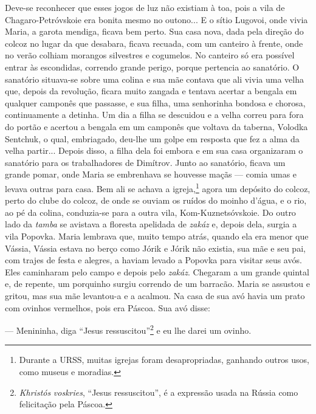 Deve-se reconhecer que esses jogos de luz não existiam à toa, pois a
vila de Chagaro-Petróvskoie era bonita mesmo no outono... E o sítio
Lugovoi, onde vivia Maria, a garota mendiga, ficava bem perto. Sua casa
nova, dada pela direção do colcoz no lugar da que desabara, ficava
recuada, com um canteiro à frente, onde no verão colhiam morangos
silvestres e cogumelos. No canteiro só era possível entrar às
escondidas, correndo grande perigo, porque pertencia ao sanatório. O
sanatório situava-se sobre uma colina e sua mãe contava que ali vivia
uma velha que, depois da revolução, ficara muito zangada e tentava
acertar a bengala em qualquer camponês que passasse, e sua filha, uma
senhorinha bondosa e chorosa, continuamente a detinha. Um dia a filha se
descuidou e a velha correu para fora do portão e acertou a bengala em um
camponês que voltava da taberna, Volodka Sentchuk, o qual, embriagado,
deu-lhe um golpe em resposta que fez a alma da velha partir... Depois
disso, a filha dela foi embora e em sua casa organizaram o sanatório
para os trabalhadores de Dimítrov. Junto ao sanatório, ficava um grande
pomar, onde Maria se embrenhava se houvesse maçãs --- comia umas e
levava outras para casa. Bem ali se achava a igreja,\footnote{Durante a
  URSS, muitas igrejas foram desapropriadas, ganhando outros usos, como
  museus e moradias.} agora um depósito do colcoz, perto do clube do
colcoz, de onde se ouviam os ruídos do moinho d'água, e o rio, ao pé da
colina, conduzia-se para a outra vila, Kom-Kuznetsóvskoie. Do outro lado
da \emph{tamba} se avistava a floresta apelidada de \emph{zakáz} e,
depois dela, surgia a vila Popovka. Maria lembrava que, muito tempo
atrás, quando ela era menor que Vássia, Vássia estava no berço como
Jórik e Jórik não existia, sua mãe e seu pai, com trajes de festa e
alegres, a haviam levado a Popovka para visitar seus avós. Eles
caminharam pelo campo e depois pelo \emph{zakáz}. Chegaram a um grande
quintal e, de repente, um porquinho surgiu correndo de um barracão.
Maria se assustou e gritou, mas sua mãe levantou-a e a acalmou. Na casa
de sua avó havia um prato com ovinhos vermelhos, pois era Páscoa. Sua
avó disse:

--- Menininha, diga ``Jesus ressuscitou''\footnote{\emph{Khristós}
  \emph{voskries}, ``Jesus ressuscitou'', é a expressão usada na Rússia
  como felicitação pela Páscoa.} e eu lhe darei um ovinho.

